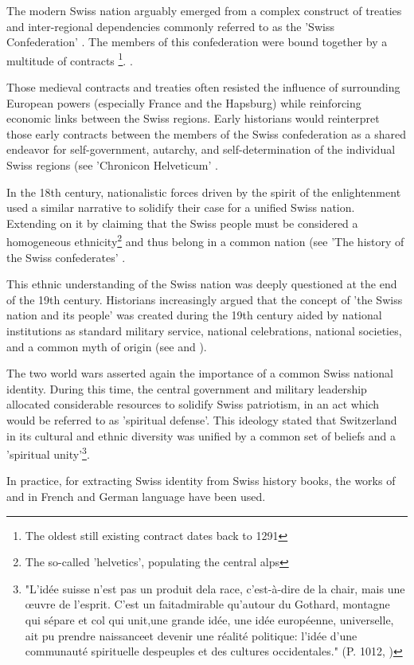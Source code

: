 \documentclass[11pt]{article}
\begin{document}
The modern Swiss nation arguably emerged from a complex construct of treaties and inter-regional dependencies commonly referred to as the 'Swiss Confederation' \citep{Eidgenossenschaft_hsl_2012}. The members of this confederation were bound together by a multitude of contracts \footnote{The oldest still existing contract dates back to 1291}. \citep{Bundesbriefe_hsl_2012}.\par
Those medieval contracts and treaties often resisted the influence of surrounding European powers (especially France and the Hapsburg) while reinforcing economic links between the Swiss regions. 
Early historians would reinterpret those early contracts between the members of the Swiss confederation as a shared endeavor for self-government, autarchy, and self-determination of the individual Swiss regions (see 'Chronicon Helveticum' \cite{tschudi1734chronicon}.\par
In the 18th century, nationalistic forces driven by the spirit of the enlightenment used a similar narrative to solidify their case for a unified Swiss nation. Extending on it by claiming that the Swiss people must be considered a homogeneous ethnicity\footnote{The so-called 'helvetics', populating the central alps} and thus belong in a common nation (see 'The history of the Swiss confederates' \cite{MuellerJohannes1780}. \par
This ethnic understanding of the Swiss nation was deeply questioned at the end of the 19th century.
Historians increasingly argued that the concept of 'the Swiss nation and its people' was created during the 19th century aided by national institutions as standard military service, national celebrations, national societies, and a common myth of origin (see \cite{seippel1900schweiz} and \cite{renan1882qu}). \par


The two world wars asserted again the importance of a common Swiss national identity. During this time, the central government and military leadership allocated considerable resources to solidify Swiss patriotism, in an act which would be referred to as 'spiritual defense'. This ideology stated that Switzerland in its cultural and ethnic diversity was unified by a common set of beliefs and a 'spiritual unity'\footnote{"L'idée  suisse  n'est  pas  un  produit  dela  race,  c'est-à-dire  de  la  chair,  mais  une  œuvre de  l'esprit.  C'est  un  faitadmirable  qu'autour  du  Gothard,  montagne  qui  sépare  et  col  qui  unit,une grande idée,  une idée européenne, universelle, ait  pu prendre naissanceet  devenir  une  réalité  politique:  l'idée  d'une  communauté  spirituelle  despeuples  et  des  cultures  occidentales." (P. 1012, \cite{conseilFederal1938})}. \citep{LandesverteidigungJorio_hsl_2012} \par 
In practice, for extracting Swiss identity from Swiss history books, the works of \cite{MuellerJohannes1780} and \cite{seippel1900schweiz} in French and German language have been used. 
\end{document}
